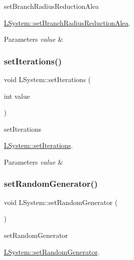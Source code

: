 set\+Branch\+Radius\+Reduction\+Alea 

\hyperlink{classLSystem_abc2ccf751660dc5ffb4e90db527bed38}{L\+System\+::set\+Branch\+Radius\+Reduction\+Alea}.


\begin{DoxyParams}{Parameters}
{\em value} & \\
\hline
\end{DoxyParams}
\mbox{\label{classLSystem_ab4cf1ae8b7ba189c6078970be98df8e7}} 
\subsubsection{\texorpdfstring{set\+Iterations()}{setIterations()}}
{\footnotesize\ttfamily void L\+System\+::set\+Iterations (\begin{DoxyParamCaption}\item[{int}]{value }\end{DoxyParamCaption})}



set\+Iterations 

\hyperlink{classLSystem_ab4cf1ae8b7ba189c6078970be98df8e7}{L\+System\+::set\+Iterations}.


\begin{DoxyParams}{Parameters}
{\em value} & \\
\hline
\end{DoxyParams}
\mbox{\label{classLSystem_a91a77e99c7a237c8504dfa5dd01f9570}} 
\subsubsection{\texorpdfstring{set\+Random\+Generator()}{setRandomGenerator()}}
{\footnotesize\ttfamily void L\+System\+::set\+Random\+Generator (\begin{DoxyParamCaption}{ }\end{DoxyParamCaption})}



set\+Random\+Generator 

\hyperlink{classLSystem_a91a77e99c7a237c8504dfa5dd01f9570}{L\+System\+::set\+Random\+Generator}. \mbox{\label{classLSystem_a983ac2b4d6becc3a5f8b5ab082b71de1}} 
